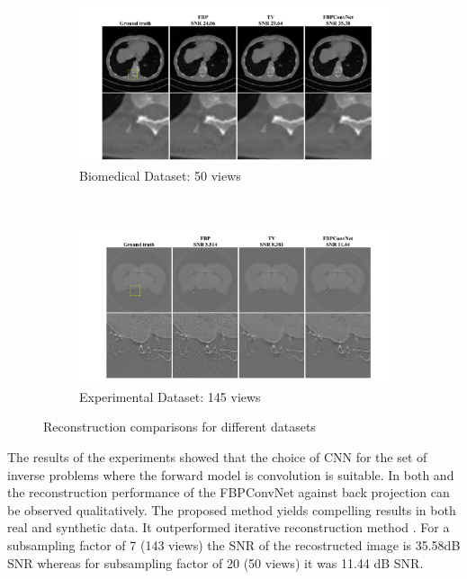 \documentclass[journal, onecolumn, 11pt]{IEEEtran}
\begin{document}

\begin{figure}[h]
\centering
\begin{subfigure}[b]{0.75\textwidth}
\centering
\includegraphics[width=\textwidth]{images/results1.png}
\caption{Biomedical Dataset: 50 views}\label{subfig:a}
\end{subfigure}
\\
\begin{subfigure}[b]{0.75\linewidth}
\centering
\includegraphics[width=\textwidth]{images/results2.png}
\caption{Experimental Dataset: 145 views}\label{subfig:b}
\end{subfigure}
\caption{Reconstruction comparisons for different datasets}
\label{fig:recs}
\end{figure}

The results of the experiments showed that the choice of CNN for the set of inverse problems where the forward model is convolution is suitable. In both  and  the reconstruction performance of the FBPConvNet against back projection can be observed qualitatively. The proposed method yields compelling results in both real and synthetic data. It outperformed iterative reconstruction method \cite{TV}. For a subsampling factor of 7 (143 views) the SNR of the recostructed image is 35.58dB SNR whereas for subsampling factor of 20 (50 views) it was 11.44 dB SNR. 
\end{document}
